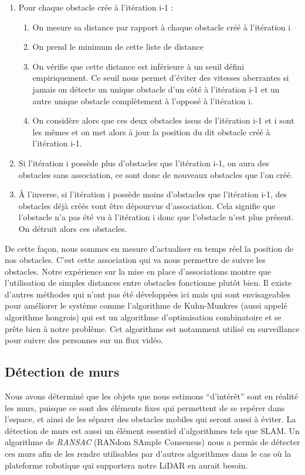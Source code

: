 \begin{enumerate}
    \item Pour chaque obstacle crée à l'itération i-1 :
        \tab \begin{enumerate}
            \item On mesure sa distance par rapport à chaque obstacle créé à l'itération i
            \item On prend le minimum de cette liste de distance
            \item On vérifie que cette distance est inférieure à un seuil défini empiriquement. Ce seuil nous permet d'éviter des vitesses aberrantes si jamais on détecte un unique obstacle d'un côté à l'itération i-1 et un autre unique obstacle complètement à l'opposé à l'itération i.
            \item On considère alors que ces deux obstacles issus de l'itération i-1 et i sont les mêmes et on met alors à jour la position du dit obstacle créé à l'itération i-1.
        \end{enumerate}
    \item Si l'itération i possède plus d'obstacles que l'itération i-1, on aura des obstacles sans association, ce sont donc de nouveaux obstacles que l'on créé. 
    \item À l'inverse, si l'itération i possède moins d'obstacles que l'itération i-1, des obstacles déjà créés vont être dépourvus d'association. Cela signifie que l'obstacle n'a pas été vu à l'itération i donc que l'obstacle n'est plus présent. On détruit alors ces obstacles.
\end{enumerate}
\tab De cette façon, nous sommes en mesure d'actualiser en temps réel la position de nos obstacles. C'est cette association qui va nous permettre de suivre les obstacles. Notre expérience sur la mise en place d'associations montre que l'utilisation de simples distances entre obstacles fonctionne plutôt bien. Il existe d'autres méthodes qui n'ont pas été développées ici mais qui sont envisageables pour améliorer le système comme l'algorithme de Kuhn-Munkres (aussi appelé algorithme hongrois) qui est un algorithme d'optimisation combinatoire et se prête bien à notre problème. Cet algorithme est notamment utilisé en surveillance pour suivre des personnes sur un flux vidéo.

\subsection{Détection de murs}
\tab Nous avons déterminé que les objets que nous estimons “d’intérêt” sont en réalité les murs, puisque ce sont des éléments fixes qui permettent de se repérer dans l’espace, et ainsi de les séparer des obstacles mobiles qui seront aussi à éviter. La détection de murs est aussi un élément essentiel d'algorithmes tels que SLAM. Un algorithme de \textit{RANSAC} (RANdom SAmple Consensus) nous a permis de détecter ces murs afin de les rendre utilisables par d’autres algorithmes dans le cas où la plateforme robotique qui supportera notre LiDAR en aurait besoin.

